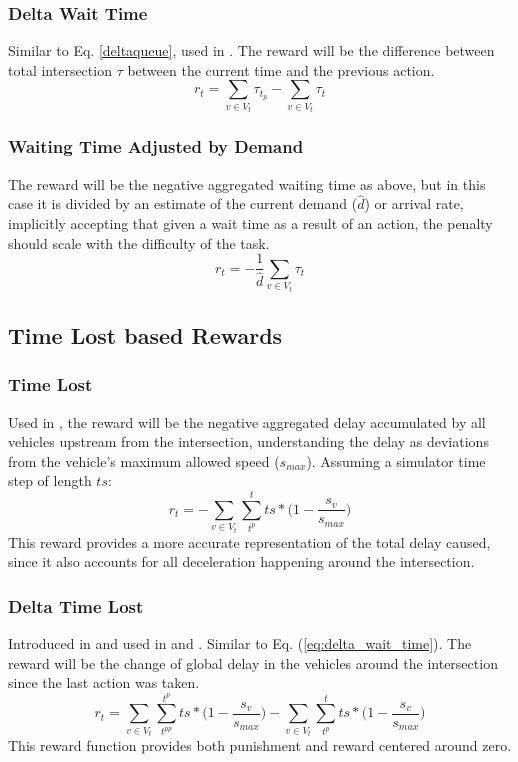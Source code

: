 \documentclass[conference]{IEEEtran}
\begin{document}
\subsubsection{Delta Wait Time}
Similar to Eq. \ref{deltaqueue}, used in \cite{liang2018}. The reward will be the difference between total intersection $\tau$ between the current time and the previous action. 
\begin{equation}
r_t =  \sum_{v \in V_t} \tau_{t_p} -  \sum_{v \in V_t} \tau_{t}
\label{eq:delta_wait_time}
\end{equation}

\subsubsection{Waiting Time Adjusted by Demand}
The reward will be the negative aggregated waiting time as above, but in this case it is divided by an estimate of the current demand ($\hat{d}$) or arrival rate, implicitly accepting that given a wait time as a result of an action, the penalty should scale with the difficulty of the task.
\begin{equation}
   r_t = -\frac{1}{\hat{d}} \sum_{v \in V_t} \tau_{t}
\label{eq:wait_time_norm} 
\end{equation}

\subsection{Time Lost based Rewards}
\subsubsection{Time Lost}
Used in \cite{wan2018}, the reward will be the negative aggregated delay accumulated by all vehicles upstream from the intersection, understanding the delay as deviations from the vehicle's maximum allowed speed ($s_{max}$). 
Assuming a simulator time step of length $ts$:
\begin{equation}
    r_t = - \sum_{v \in V_t}  \sum_{t^p}^t ts * \big( 1-\frac{s_v}{s_{max}} \big)
\label{eq:delay}
\end{equation}
This reward provides a more accurate representation of the total delay caused, since it also accounts for all deceleration happening around the intersection. 

\subsubsection{Delta Time Lost}
Introduced in \cite{abdulhai2010} and used in \cite{mannion} \cite{genders2016} \cite{gao2017} \cite{mousavi2017} and \cite{genders2018}.
Similar to Eq. (\ref{eq:delta_wait_time}).
The reward will be the change of global delay in the vehicles around the intersection since the last action was taken.
\begin{equation}
   r_t = \sum_{v \in V_t}  \sum_{t^{pp}}^{t^p} ts * \big( 1-\frac{s_v}{s_{max}} \big) - \sum_{v \in V_t}  \sum_{t^p}^t ts * \big( 1-\frac{s_v}{s_{max}} \big)
\label{eq:changedelay} 
\end{equation}
This reward function provides both punishment and reward centered around zero.
\end{document}
